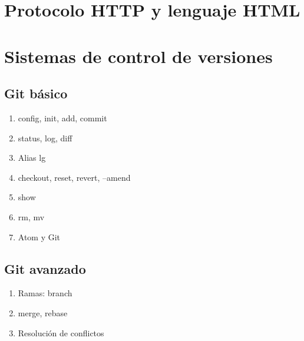 \documentclass[a4paper,11pt,spanish]{sphinxmanual}
\begin{document}
\part{Protocolo HTTP y lenguaje HTML}
\label{\detokenize{protocolo-http-y-lenguaje-html::doc}}\label{\detokenize{protocolo-http-y-lenguaje-html:protocolo-http-y-lenguaje-html}}

\part{Sistemas de control de versiones}
\label{\detokenize{sistemas-de-control-de-versiones:sistemas-de-control-de-versiones}}\label{\detokenize{sistemas-de-control-de-versiones::doc}}

\chapter{Git básico}
\label{\detokenize{sistemas-de-control-de-versiones:git-basico}}\begin{enumerate}
\item {} 
config, init, add, commit

\item {} 
status, log, diff

\item {} 
Alias lg

\item {} 
checkout, reset, revert, --amend

\item {} 
show

\item {} 
rm, mv

\item {} 
Atom y Git

\end{enumerate}


\chapter{Git avanzado}
\label{\detokenize{sistemas-de-control-de-versiones:git-avanzado}}\begin{enumerate}
\item {} 
Ramas: branch

\item {} 
merge, rebase

\item {} 
Resolución de conflictos

\end{enumerate}
\end{document}
